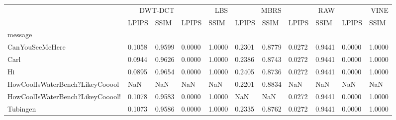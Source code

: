 \begin{tabular}{lllllllllll}
\toprule
 & \multicolumn{2}{r}{DWT-DCT} & \multicolumn{2}{r}{LBS} & \multicolumn{2}{r}{MBRS} & \multicolumn{2}{r}{RAW} & \multicolumn{2}{r}{VINE} \\
 & LPIPS & SSIM & LPIPS & SSIM & LPIPS & SSIM & LPIPS & SSIM & LPIPS & SSIM \\
message &  &  &  &  &  &  &  &  &  &  \\
\midrule
CanYouSeeMeHere & 0.1058 & 0.9599 & 0.0000 & 1.0000 & 0.2301 & 0.8779 & 0.0272 & 0.9441 & 0.0000 & 1.0000 \\
Carl & 0.0944 & 0.9626 & 0.0000 & 1.0000 & 0.2386 & 0.8743 & 0.0272 & 0.9441 & 0.0000 & 1.0000 \\
Hi & 0.0895 & 0.9654 & 0.0000 & 1.0000 & 0.2405 & 0.8736 & 0.0272 & 0.9441 & 0.0000 & 1.0000 \\
HowCoolIsWaterBench?LikeyCooool & NaN & NaN & NaN & NaN & 0.2201 & 0.8834 & NaN & NaN & NaN & NaN \\
HowCoolIsWaterBench?LikeyCooool! & 0.1078 & 0.9583 & 0.0000 & 1.0000 & NaN & NaN & 0.0272 & 0.9441 & 0.0000 & 1.0000 \\
Tubingen & 0.1073 & 0.9586 & 0.0000 & 1.0000 & 0.2335 & 0.8762 & 0.0272 & 0.9441 & 0.0000 & 1.0000 \\
\bottomrule
\end{tabular}
